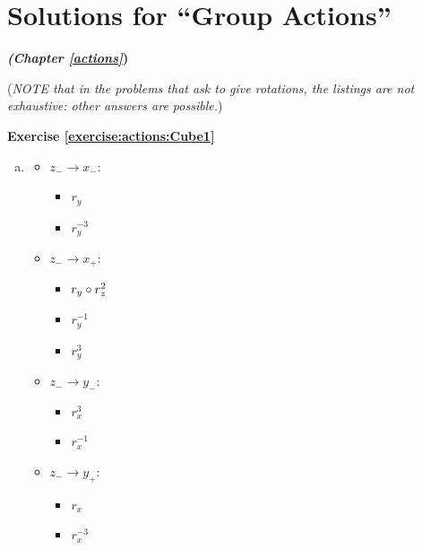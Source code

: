
\section{Solutions for ``Group Actions''}
\noindent\textbf{\textit{ (Chapter \ref{actions}})}\bigskip

\noindent(\emph{NOTE that in the problems that ask to give rotations, the listings are not exhaustive: other answers are possible.})

\noindent\textbf{Exercise \ref{exercise:actions:Cube1}}
\begin{enumerate}[(a)]
\item
	\begin{multicols}{4}
	\begin{itemize}
	\item
	$z_-\rightarrow x_-$: 
		\begin{itemize}
		\item
		$r_y$
		
		\item
		$r_y^{-3} $ 
		\end{itemize}
				
	\item
	$z_-\rightarrow x_+$: 
		\begin{itemize}
		\item
		$r_y\circ r_z^2$
		
		\item
		$r_y^{-1}$
		
		\item
		$r_y^3$
		\end{itemize}
				
	\item
	$z_-\rightarrow y_-$: 
		\begin{itemize}
		\item
		$r_x^3$
		
		\item
		$r_x^{-1}$
		\end{itemize}
				
	\item
	$z_-\rightarrow y_+$:
		\begin{itemize}
		\item
		$r_x$
		
		\item
		$r_x^{-3}$
		\end{itemize}
				
	\end{itemize}
	\end{multicols}
	

\end{enumerate}
